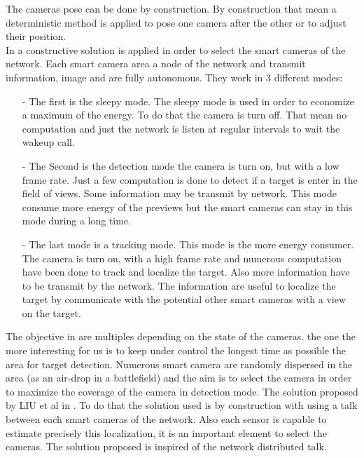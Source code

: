 The cameras pose can be done by construction. By construction that mean a deterministic method is applied to pose one camera after the other or to adjust their position.\\
In \cite{38*liu2010} a constructive solution is applied in order to select the smart cameras of the network. Each smart camera area a node of the network and transmit information, image and are fully autonomous. 
They work in 3 different modes:\\
\begin{itemize}
\item[-] The first is the sleepy mode. The sleepy mode is used in order to economize a maximum of the energy. To do that the camera is turn off. That mean no computation and just the network is listen at regular intervals to wait the wakeup call.   \\

\item[-] The Second is the detection mode the camera is turn on, but with a low frame rate. Just a few computation is done to detect if a target is enter in the field of views. Some information may be transmit by network. This mode consume more energy of the previews but the smart cameras can stay in this mode during a long time.\\

\item[-] The last mode is a tracking mode. This mode is the more energy consumer. The camera is turn on, with a high frame rate and numerous computation have been done to track and localize the target. Also more information have to be transmit by the network. The information are useful to localize the target by communicate with  the potential other smart cameras with a view on the target. \\
\end{itemize}
The objective in \cite{38*liu2010} are multiples depending on the state of the cameras. the one the more interesting for us is to keep under control the longest time as possible the area for target detection. Numerous smart camera are randomly dispersed in the area (as an air-drop in a battlefield) and the aim is to select the camera in order to maximize the coverage of the camera in detection mode. The solution proposed by LIU  et al in \cite{38*liu2010}.
To do that the solution used is by construction with using a talk between each smart cameras of the network. Also each sensor is capable to estimate precisely this localization, it is an important element to select the cameras. The solution proposed is inspired of the network distributed talk. \\
